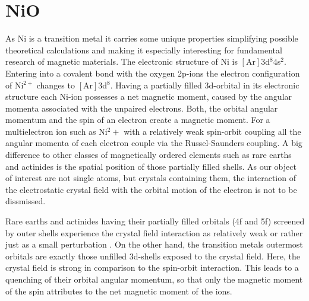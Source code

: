 

\section{NiO}
As Ni is a transition metal it carries some unique properties simplifying possible theoretical calculations and making it especially interesting for fundamental research of magnetic materials.
The electronic structure of Ni is $[\text{Ar}]3$d$^8 4$s$^2$.
Entering into a covalent bond with the oxygen 2p-ions the electron configuration of Ni$^{2+}$ changes to $[\text{Ar}]3$d$^8$.
Having a partially filled 3d-orbital in its electronic structure each Ni-ion possesses a net magnetic moment, caused by the angular momenta associated with the unpaired electrons.
Both, the orbital angular momentum and the spin of an electron create a magnetic moment.
For a multielectron ion such as Ni$^2+$ with a relatively weak spin-orbit coupling all the angular momenta of each electron couple via the Russel-Saunders coupling.
A big difference to other classes of magnetically ordered elements such as rare earths and actinides is the spatial position of those partially filled shells.
As our object of interest are not single atoms, but crystals containing them, the interaction of the electrostatic crystal field with the orbital motion of the electron is not to be dissmissed.

Rare earths and actinides having their partially filled orbitals (4f and 5f) screened by outer shells experience the crystal field interaction as relatively weak or rather just as a small perturbation .
On the other hand, the transition metals outermost orbitals are exactly those unfilled 3d-shells exposed to the crystal field.
Here, the crystal field is strong in comparison to the spin-orbit interaction.
This leads to a quenching of their orbital angular momentum, so that only the magnetic moment of the spin attributes to the net magnetic moment of the ions.

